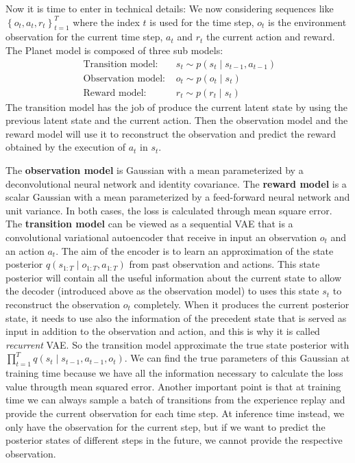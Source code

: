 Now it is time to enter in technical details:
We now considering sequences like $\left\{o_{t}, a_{t}, r_{t}\right\}_{t=1}^{T}$ where the index $t$ is used for the time step, $o_t$ is the environment observation for the current time step, $a_t$ and $r_t$ the current action and reward.
The Planet model is composed of three sub models:
\begin{align*}
\text { Transition model: } & s_{t} \sim p\left(s_{t} \mid s_{t-1}, a_{t-1}\right) \\
\text { Observation model: } & o_{t} \sim p\left(o_{t} \mid s_{t}\right) \\
\text { Reward model: } & r_{t} \sim p\left(r_{t} \mid s_{t}\right)
\end{align*}
The transition model has the job of produce the current latent state by using the previous latent state and the current action.
Then the observation model and the reward model will use it to reconstruct the observation and predict the reward obtained by the execution of $a_{t}$  in $s_{t}$. 

The \textbf{observation model} is Gaussian with a mean parameterized by a deconvolutional neural network and identity covariance.
The \textbf{reward model} is a scalar Gaussian with a mean parameterized by a feed-forward neural network and unit variance.
In both cases, the loss is calculated through mean square error.
The \textbf{transition model} can be viewed as a sequential VAE that is a convolutional variational autoencoder that receive in input an observation $o_t$ and an action $a_t$.
The aim of the encoder is to learn an approximation of the state posterior $q\left( s_{1:T} \mid o_{1:T}, a_{1:T}   \right) $ from past observation and actions. 
This state posterior will contain all the useful information about the current state to allow the decoder (introduced above as the observation model) to uses this state $s_t$ to reconstruct the observation $o_t$ completely.
When it produces the current posterior state, it needs to use also the information of the precedent state that is served as input in addition to the observation and action, and this is why it is called \textit{recurrent} VAE.
So the transition model approximate the true state posterior with $\prod_{t=1}^{T} q\left(s_{t} \mid s_{t-1}, a_{t-1}, o_{t}\right)$.
We can find the true parameters of this Gaussian at training time because we have all the information necessary to calculate the loss value througth mean squared error. 
Another important point is that at training time we can always sample a batch of transitions from the experience replay and  provide the current observation for each time step. 
At inference time instead, we only have the observation for the current step, but if we want to predict the posterior states of different steps in the future, we cannot provide the respective observation.

